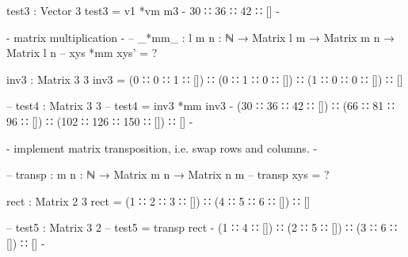 test3 : Vector 3
test3 = v1 *vm m3
{- 30 ∷ 36 ∷ 42 ∷ [] -}

{- matrix multiplication -}
-- _*mm_ : {l m n : ℕ} → Matrix l m → Matrix m n → Matrix l n
-- xys *mm xys' = ?

inv3 : Matrix 3 3
inv3 = (0 ∷ 0 ∷ 1 ∷ []) 
     ∷ (0 ∷ 1 ∷ 0 ∷ []) 
     ∷ (1 ∷ 0 ∷ 0 ∷ []) 
     ∷ []

-- test4 : Matrix 3 3
-- test4 = inv3 *mm inv3
{-
(30 ∷ 36 ∷ 42 ∷ []) ∷
(66 ∷ 81 ∷ 96 ∷ []) ∷
(102 ∷ 126 ∷ 150 ∷ [])
∷ []
-}

{- implement matrix transposition, i.e. swap rows and columns. -}

-- transp : {m n : ℕ} → Matrix m n → Matrix n m
-- transp xys = ? 

rect : Matrix 2 3
rect = (1 ∷ 2 ∷ 3 ∷ [])
     ∷ (4 ∷ 5 ∷ 6 ∷ [])
     ∷ []

-- test5 : Matrix 3 2
-- test5 = transp rect
{-
(1 ∷ 4 ∷ []) ∷
(2 ∷ 5 ∷ []) ∷
(3 ∷ 6 ∷ []) ∷ []
-}



